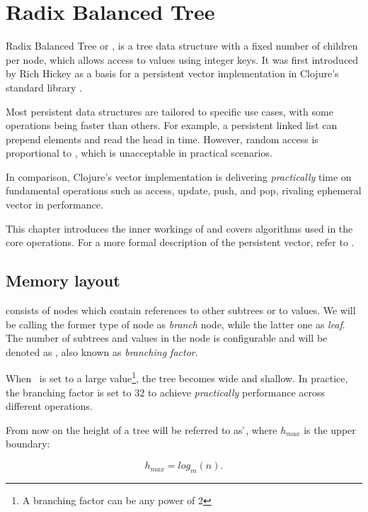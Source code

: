 \chapter{Radix Balanced Tree}

Radix Balanced Tree or \rbtree, is a tree data structure with a fixed number of children per node, which allows access to values using integer keys. It was first introduced by Rich Hickey as a basis for a persistent vector implementation in Clojure's standard library \cite{the-clojure-programming-language}. 

Most persistent data structures are tailored to specific use cases, with some operations being faster than others. For example, a persistent linked list can prepend elements and read the head in  time. However, random access is proportional to , which is unacceptable in practical scenarios. 

In comparison, Clojure's vector implementation is delivering \emph{practically}  time on fundamental operations such as access, update, push, and pop, rivaling ephemeral vector in performance.

This chapter introduces the inner workings of \rbtree{} and covers algorithms used in the core operations. For a more formal description of the persistent vector, refer to \cite{improving-performance-through-transience}. 

\section{Memory layout}
\label{sec:rb-tree-memory-layout}

\rbtree{} consists of nodes which contain references to other subtrees or to values. We will be calling the former type of node as \emph{branch} node, while the latter one as \emph{leaf}. The number of subtrees and values in the node is configurable and will be denoted as \m, also known as \emph{branching factor}. 

When \m\ is set to a large value\footnote{A branching factor can be any power of 2}, the tree becomes wide and shallow. In practice, the branching factor is set to 32 to achieve \emph{practically}  performance across different operations.

From now on the height of a tree will be referred to as \h{}, where $h_{max}$ is the upper boundary:

\begin{equation}
    h_{max} = log_m(n).
\end{equation}

